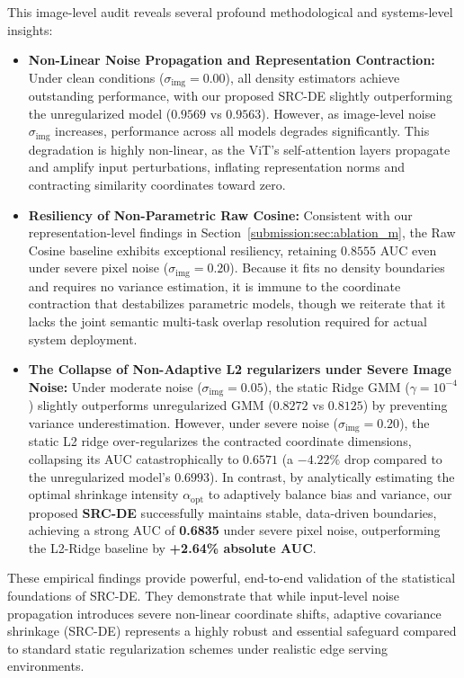 This image-level audit reveals several profound methodological and systems-level insights:
\begin{itemize}
    \item {\bf Non-Linear Noise Propagation and Representation Contraction:} Under clean conditions ($\sigma_{\text{img}}=0.00$), all density estimators achieve outstanding performance, with our proposed SRC-DE slightly outperforming the unregularized model ($0.9569$ vs $0.9563$). However, as image-level noise $\sigma_{\text{img}}$ increases, performance across all models degrades significantly. This degradation is highly non-linear, as the ViT's self-attention layers propagate and amplify input perturbations, inflating representation norms and contracting similarity coordinates toward zero.
    \item {\bf Resiliency of Non-Parametric Raw Cosine:} Consistent with our representation-level findings in Section~\ref{submission:sec:ablation_m}, the Raw Cosine baseline exhibits exceptional resiliency, retaining $0.8555$ AUC even under severe pixel noise ($\sigma_{\text{img}}=0.20$). Because it fits no density boundaries and requires no variance estimation, it is immune to the coordinate contraction that destabilizes parametric models, though we reiterate that it lacks the joint semantic multi-task overlap resolution required for actual system deployment.
    \item {\bf The Collapse of Non-Adaptive L2 regularizers under Severe Image Noise:} Under moderate noise ($\sigma_{\text{img}}=0.05$), the static Ridge GMM ($\gamma = 10^{-4}$) slightly outperforms unregularized GMM ($0.8272$ vs $0.8125$) by preventing variance underestimation. However, under severe noise ($\sigma_{\text{img}}=0.20$), the static L2 ridge over-regularizes the contracted coordinate dimensions, collapsing its AUC catastrophically to $0.6571$ (a $-4.22\%$ drop compared to the unregularized model's $0.6993$). In contrast, by analytically estimating the optimal shrinkage intensity $\alpha_{\text{opt}}$ to adaptively balance bias and variance, our proposed {\bf SRC-DE} successfully maintains stable, data-driven boundaries, achieving a strong AUC of {\bf 0.6835} under severe pixel noise, outperforming the L2-Ridge baseline by {\bf +2.64\% absolute AUC}.
\end{itemize}
These empirical findings provide powerful, end-to-end validation of the statistical foundations of SRC-DE. They demonstrate that while input-level noise propagation introduces severe non-linear coordinate shifts, adaptive covariance shrinkage (SRC-DE) represents a highly robust and essential safeguard compared to standard static regularization schemes under realistic edge serving environments.

